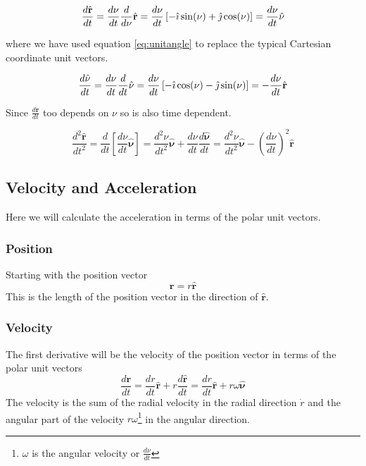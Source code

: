 \begin{equation} \label{eq:radvel}
\frac{d {\hat{\mathbf{r}}}}{d t} = \frac{ d \nu}{d t}\frac{d}{d \nu} \hat{\mathbf{r}} =  \frac{ d \nu}{d t} \left[ -\hat{\imath} \sin( \nu ) + \hat{\jmath} \cos( \nu ) \right] = \frac{ d \nu}{d t} \hat{\mathbf{\nu}}
\end{equation}

where we have used equation \ref{eq:unitangle} to replace the typical Cartesian coordinate unit vectors.

\begin{equation}\label{eq:angvel}
\frac{d {\hat{\mathbf{\nu}}}}{d t}=\frac{d \nu}{d t} \frac{d}{dt}{\hat{\mathbf{\nu}}}=\frac{d \nu}{d t}  \left[ - \hat{\imath} \cos( \nu ) - \hat{\jmath} \sin( \nu ) \right]=- \frac{d \nu}{d t} \hat{\mathbf{r}}
\end{equation}

 Since $\frac{d {\hat{\mathbf{r}}}}{d t}$ too depends on $\nu$ so is also time dependent.

\begin{equation} \label{eq:radaccel}
\frac{d^2 {\hat{\mathbf{r}}}}{d t^2} = \frac{d}{dt}\left[ \frac{ d \nu}{d t} \hat{\mathbf{\nu}} \right]=\frac{d^2 \nu}{d t^2}\hat{\mathbf{\nu}}+\frac{d \nu}{d t} \frac{d \hat{\mathbf{\nu}}}{dt}=\frac{d^2 \nu}{d t^2}\hat{\mathbf{\nu}}-\left(\frac{d \nu}{d t} \right)^2  \hat{\mathbf{r}} 
\end{equation}

\subsection{Velocity and Acceleration}
Here we will calculate the acceleration in terms of the polar unit vectors. 

\subsubsection{Position}
Starting with the position vector
\begin{equation}
\textbf{r}= r \hat{\textbf{r}} \label{eq:perifocal-position}
\end{equation}
This is the length of the position vector in the direction of $\hat{\mathbf{r}}$.

\subsubsection{Velocity}
The first derivative will be the velocity of the position vector in terms of the polar unit vectors
\begin{equation}\label{eq:vel}
\frac{d \mathbf{r}}{d t} = \frac{d r}{d t} \hat{\mathbf{r}} + r \frac{d \hat{\mathbf{r}}}{d t}=\frac{d r}{d t} \hat{\mathbf{r}} + r \omega \hat{\mathbf{\nu}}
\end{equation}
The velocity is the sum of the radial velocity in the radial direction $\dot{r}$ and the angular part of the velocity $r \omega$\footnote{$\omega$ is the angular velocity or $\frac{d \nu}{dt}$} in the angular direction.

